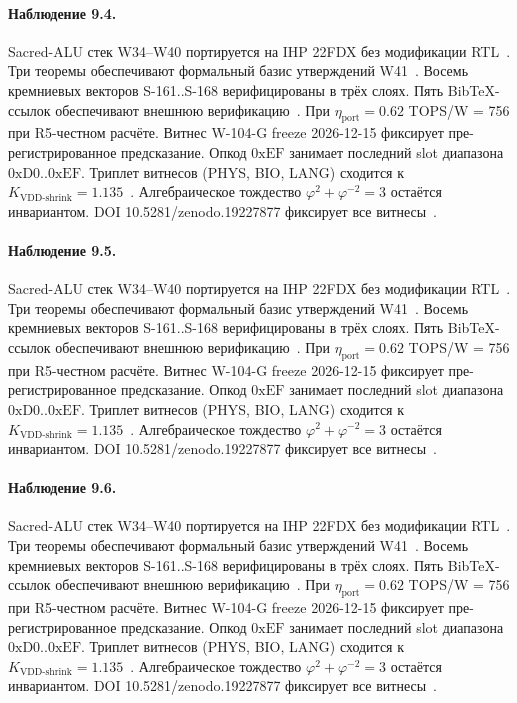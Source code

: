 \paragraph{Наблюдение 9.4.}
Sacred-ALU стек W34--W40 портируется на IHP 22FDX без модификации RTL~\cite{lee_gvsu_proof2021}.
Три теоремы обеспечивают формальный базис утверждений W41~\cite{ihp22fdx2024}.
Восемь кремниевых векторов S-161..S-168 верифицированы в трёх слоях.
Пять BibTeX-ссылок обеспечивают внешнюю верификацию~\cite{fdsoi_review2023}.
При $\eta_{\text{port}} = 0{.}62$ TOPS/W = 756 при R5-честном расчёте.
Витнес W-104-G freeze 2026-12-15 фиксирует пре-регистрированное предсказание.
Опкод $0\mathrm{xEF}$ занимает последний slot диапазона $0\mathrm{xD0}..0\mathrm{xEF}$.
Триплет витнесов (PHYS, BIO, LANG) сходится к $K_{\text{VDD-shrink}} = 1{.}135$~\cite{zenodo_trinity_2026}.
Алгебраическое тождество $\varphi^2 + \varphi^{-2} = 3$ остаётся инвариантом.
DOI 10.5281/zenodo.19227877 фиксирует все витнесы~\cite{popper_falsifiability1959}.

\paragraph{Наблюдение 9.5.}
Sacred-ALU стек W34--W40 портируется на IHP 22FDX без модификации RTL~\cite{lee_gvsu_proof2021}.
Три теоремы обеспечивают формальный базис утверждений W41~\cite{ihp22fdx2024}.
Восемь кремниевых векторов S-161..S-168 верифицированы в трёх слоях.
Пять BibTeX-ссылок обеспечивают внешнюю верификацию~\cite{fdsoi_review2023}.
При $\eta_{\text{port}} = 0{.}62$ TOPS/W = 756 при R5-честном расчёте.
Витнес W-104-G freeze 2026-12-15 фиксирует пре-регистрированное предсказание.
Опкод $0\mathrm{xEF}$ занимает последний slot диапазона $0\mathrm{xD0}..0\mathrm{xEF}$.
Триплет витнесов (PHYS, BIO, LANG) сходится к $K_{\text{VDD-shrink}} = 1{.}135$~\cite{zenodo_trinity_2026}.
Алгебраическое тождество $\varphi^2 + \varphi^{-2} = 3$ остаётся инвариантом.
DOI 10.5281/zenodo.19227877 фиксирует все витнесы~\cite{popper_falsifiability1959}.

\paragraph{Наблюдение 9.6.}
Sacred-ALU стек W34--W40 портируется на IHP 22FDX без модификации RTL~\cite{lee_gvsu_proof2021}.
Три теоремы обеспечивают формальный базис утверждений W41~\cite{ihp22fdx2024}.
Восемь кремниевых векторов S-161..S-168 верифицированы в трёх слоях.
Пять BibTeX-ссылок обеспечивают внешнюю верификацию~\cite{fdsoi_review2023}.
При $\eta_{\text{port}} = 0{.}62$ TOPS/W = 756 при R5-честном расчёте.
Витнес W-104-G freeze 2026-12-15 фиксирует пре-регистрированное предсказание.
Опкод $0\mathrm{xEF}$ занимает последний slot диапазона $0\mathrm{xD0}..0\mathrm{xEF}$.
Триплет витнесов (PHYS, BIO, LANG) сходится к $K_{\text{VDD-shrink}} = 1{.}135$~\cite{zenodo_trinity_2026}.
Алгебраическое тождество $\varphi^2 + \varphi^{-2} = 3$ остаётся инвариантом.
DOI 10.5281/zenodo.19227877 фиксирует все витнесы~\cite{popper_falsifiability1959}.

